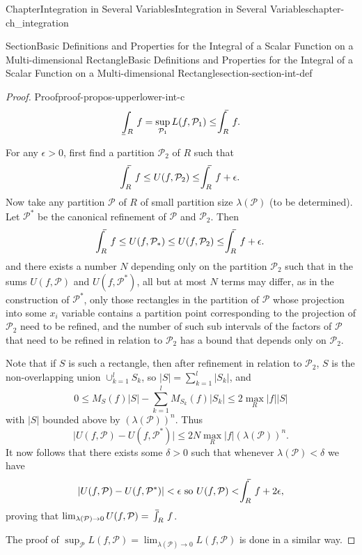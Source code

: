 \documentclass[oneside,10pt,]{book}
\makeatletter
\numberwithin{equation}{section}
\newcommand{\cP}{\mathcal{P}}
\def\upint{\mathchoice
    {\mkern10mu\overline{\vphantom{\intop}\mkern7mu}\mkern-24mu}
    {\mkern7mu\overline{\vphantom{\intop}\mkern7mu}\mkern-14mu}
    {\mkern7mu\overline{\vphantom{\intop}\mkern7mu}\mkern-14mu}
    {\mkern7mu\overline{\vphantom{\intop}\mkern7mu}\mkern-14mu}
  \int}
\def\lowint{\relax\if@display
 \mkern3mu\underline{\vphantom{\intop}\mkern7mu}\mkern-10mu\int
\else 
\underline{\vphantom{\int}\mkern7mu}\mkern-10mu\int
\fi}
\makeatother
\begin{document}
\begin{chapterptx}{Chapter}{Integration in Several Variables}{}{Integration in Several Variables}{}{}{chapter-ch_integration}
\begin{sectionptx}{Section}{Basic Definitions and Properties for the Integral of a Scalar Function on a Multi-dimensional Rectangle}{}{Basic Definitions and Properties for the Integral of a Scalar Function on a Multi-dimensional Rectangle}{}{}{section-section-int-def}
\begin{proof}{Proof}{}{proof-propos-upperlower-int-c}
\begin{equation*}
\lowint_{R} \, f =\sup_{\cP_{1}} L(f, \cP_{1})\le \upint_{R} \, f.
\end{equation*}
%
\par
For any \(\epsilon>0\), first find a partition \(\cP_{2}\) of \(R\) such that%
\begin{equation*}
\upint_{R} \, f \le U(f, \cP_{2}) \le \upint_{R} \, f + \epsilon.
\end{equation*}
Now take any partition \(\cP\) of \(R\) of small partition size \(\lambda(\cP)\) (to be determined). Let \(\cP^{*}\) be the canonical refinement of \(\cP\) and \(\cP_{2}\). Then%
\begin{equation*}
\upint_{R} \, f \le U(f, \cP_{*}) \le U(f, \cP_{2}) \le \upint_{R} \, f + \epsilon.
\end{equation*}
and there exists a number \(N\) depending only on the  partition \(\cP_{2}\) such that in the sums \(U(f,\cP)\) and \(U(f, \cP^{*})\), all but at most \(N\) terms may differ, as in the construction of \(\cP^{*}\), only those rectangles in the partition of \(\cP\) whose projection into some \(x_{i}\) variable contains a partition point corresponding to the projection of \(\cP_{2}\) need to be refined, and the number of such sub intervals of the factors of \(\cP\) that need to be refined in relation to \(\cP_{2}\) has a bound that depends only on \(\cP_{2}\).%
\par
Note that  if \(S\) is such a rectangle, then after refinement in relation to \(\cP_{2}\), \(S\) is the non-overlapping union \(\cup_{k=1}^{l}S_{k}\), so \(|S|=\sum_{k=1}^{l} |S_{k}|\), and%
\begin{equation*}
0\le M_{S}(f)|S|- \sum_{k=1}^{l}M_{S_{k}}(f)|S_{k}|\le 2\max_{R}|f| |S|
\end{equation*}
with  \(|S|\) bounded above by \((\lambda(\cP))^{n}\). Thus%
\begin{equation*}
\vert U(f,\cP)- U(f, \cP^{*})\vert \le 2 N  \max_{R}|f| (\lambda(\cP))^{n}.
\end{equation*}
It now follows that there exists some \(\delta >0\) such that whenever \(\lambda(\cP) < \delta\) we have%
\begin{equation*}
\vert U(f,\cP)- U(f, \cP^{*})\vert < \epsilon  \text{ so }  U(f,\cP) < \upint_{R} \, f + 2\epsilon,
\end{equation*}
proving that \(\lim_{\lambda(\cP)\to 0} U(f, \cP)= \upint_{R} \, f\).%
\par
The proof of \(\sup_{\cP}L(f, \cP) = \lim_{\lambda(\cP)\to 0} L(f, \cP)\) is done in a similar way.%
\end{proof}

\end{sectionptx}
\end{chapterptx}
\end{document}

